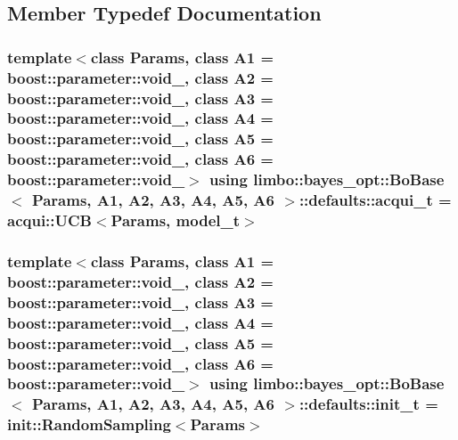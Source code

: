 \subsection{Member Typedef Documentation}
\subsubsection[{\texorpdfstring{acqui\+\_\+t}{acqui_t}}]{\setlength{\rightskip}{0pt plus 5cm}template$<$class Params, class A1 = boost\+::parameter\+::void\+\_\+, class A2 = boost\+::parameter\+::void\+\_\+, class A3 = boost\+::parameter\+::void\+\_\+, class A4 = boost\+::parameter\+::void\+\_\+, class A5 = boost\+::parameter\+::void\+\_\+, class A6 = boost\+::parameter\+::void\+\_\+$>$ using {\bf limbo\+::bayes\+\_\+opt\+::\+Bo\+Base}$<$ Params, A1, A2, A3, A4, A5, A6 $>$\+::{\bf defaults\+::acqui\+\_\+t} =  {\bf acqui\+::\+U\+CB}$<$Params, {\bf model\+\_\+t}$>$}\hypertarget{structlimbo_1_1bayes__opt_1_1_bo_base_1_1defaults_a7728ece1763ffbcac4e37f219047dcb1}{}\label{structlimbo_1_1bayes__opt_1_1_bo_base_1_1defaults_a7728ece1763ffbcac4e37f219047dcb1}
\subsubsection[{\texorpdfstring{init\+\_\+t}{init_t}}]{\setlength{\rightskip}{0pt plus 5cm}template$<$class Params, class A1 = boost\+::parameter\+::void\+\_\+, class A2 = boost\+::parameter\+::void\+\_\+, class A3 = boost\+::parameter\+::void\+\_\+, class A4 = boost\+::parameter\+::void\+\_\+, class A5 = boost\+::parameter\+::void\+\_\+, class A6 = boost\+::parameter\+::void\+\_\+$>$ using {\bf limbo\+::bayes\+\_\+opt\+::\+Bo\+Base}$<$ Params, A1, A2, A3, A4, A5, A6 $>$\+::{\bf defaults\+::init\+\_\+t} =  {\bf init\+::\+Random\+Sampling}$<$Params$>$}\hypertarget{structlimbo_1_1bayes__opt_1_1_bo_base_1_1defaults_afab889d523b8c28d1161079a5a453f79}{}\label{structlimbo_1_1bayes__opt_1_1_bo_base_1_1defaults_afab889d523b8c28d1161079a5a453f79}
